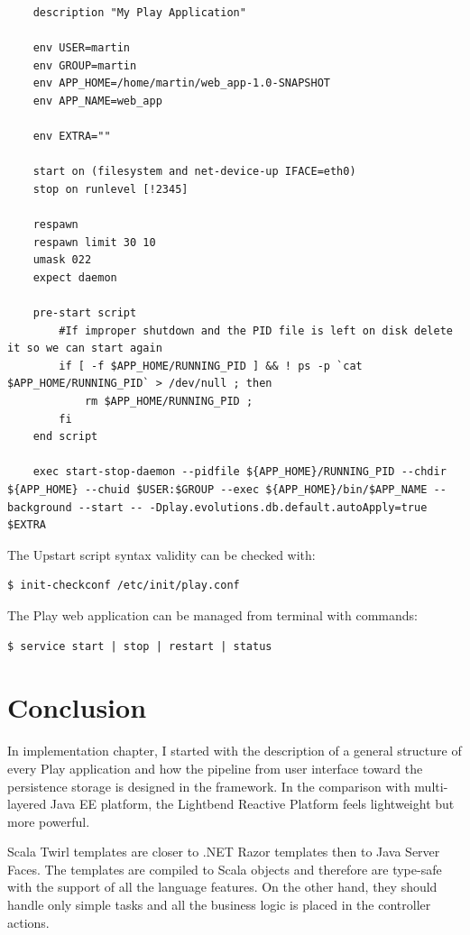 \documentclass[12pt,twoside,a4paper]{report}
\begin{document}
\begin{lstlisting} 
	description "My Play Application"

	env USER=martin
	env GROUP=martin
	env APP_HOME=/home/martin/web_app-1.0-SNAPSHOT
	env APP_NAME=web_app               
 
	env EXTRA=""
 
	start on (filesystem and net-device-up IFACE=eth0)
	stop on runlevel [!2345]
 
	respawn
	respawn limit 30 10
	umask 022
	expect daemon
 
	pre-start script
    	#If improper shutdown and the PID file is left on disk delete it so we can start again
    	if [ -f $APP_HOME/RUNNING_PID ] && ! ps -p `cat $APP_HOME/RUNNING_PID` > /dev/null ; then
        	rm $APP_HOME/RUNNING_PID ;
    	fi
	end script
 
	exec start-stop-daemon --pidfile ${APP_HOME}/RUNNING_PID --chdir ${APP_HOME} --chuid $USER:$GROUP --exec ${APP_HOME}/bin/$APP_NAME --background --start -- -Dplay.evolutions.db.default.autoApply=true $EXTRA
\end{lstlisting}
The Upstart script syntax validity can be checked with:
\begin{lstlisting} 
$ init-checkconf /etc/init/play.conf
\end{lstlisting}
The Play web application can be managed from terminal with commands:
\begin{lstlisting} 
$ service start | stop | restart | status
\end{lstlisting}


\section{Conclusion}\label{4.7}
In implementation chapter, I started with the description of a general structure of every Play application and how the pipeline from user interface toward the persistence storage is designed in the framework. In the comparison with multi-layered Java EE platform, the Lightbend Reactive Platform feels lightweight but more powerful.

Scala Twirl templates are closer to .NET Razor templates then to Java Server Faces. The templates are compiled to Scala objects and therefore are type-safe with the support of all the language features. On the other hand, they should handle only simple tasks and all the business logic is placed in the controller actions.
\end{document}
